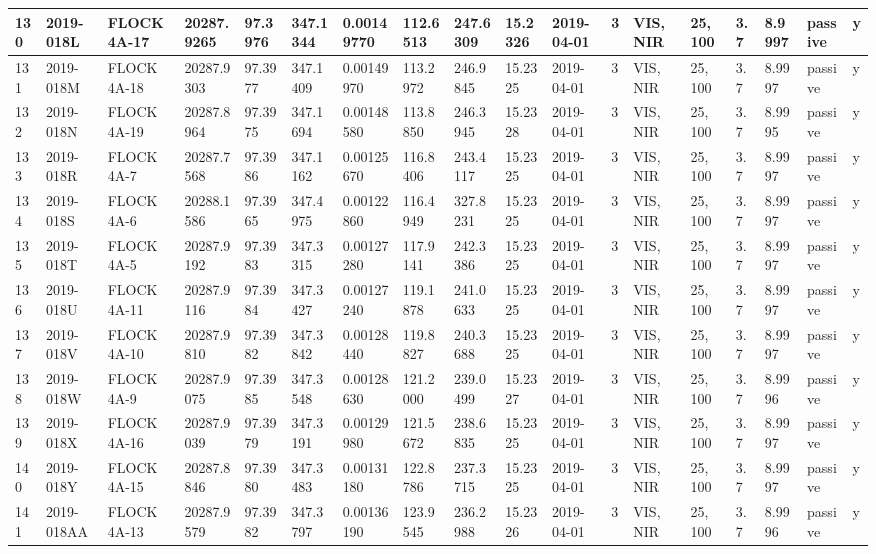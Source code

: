 \documentclass[12pt,a4paper,notitlepage,twoside,openright]{report}
\begin{document}
\begin{longtable}{|l|l|l|l|l|l|l|l|l|l|l|l|l|l|l|l|l|l|}
        130 & 2019-018L & FLOCK 4A-17 & 20287.9265 & 97.3976 & 347.1344 & 0.00149770 & 112.6513 & 247.6309 & 15.2326 & 2019-04-01 & 3 & VIS, NIR & 25, 100 & 3.7 & 8.9997 & passive & y \\ \hline
        131 & 2019-018M & FLOCK 4A-18 & 20287.9303 & 97.3977 & 347.1409 & 0.00149970 & 113.2972 & 246.9845 & 15.2325 & 2019-04-01 & 3 & VIS, NIR & 25, 100 & 3.7 & 8.9997 & passive & y \\ \hline
        132 & 2019-018N & FLOCK 4A-19 & 20287.8964 & 97.3975 & 347.1694 & 0.00148580 & 113.8850 & 246.3945 & 15.2328 & 2019-04-01 & 3 & VIS, NIR & 25, 100 & 3.7 & 8.9995 & passive & y \\ \hline
        133 & 2019-018R & FLOCK 4A-7 & 20287.7568 & 97.3986 & 347.1162 & 0.00125670 & 116.8406 & 243.4117 & 15.2325 & 2019-04-01 & 3 & VIS, NIR & 25, 100 & 3.7 & 8.9997 & passive & y \\ \hline
        134 & 2019-018S & FLOCK 4A-6 & 20288.1586 & 97.3965 & 347.4975 & 0.00122860 & 116.4949 & 327.8231 & 15.2325 & 2019-04-01 & 3 & VIS, NIR & 25, 100 & 3.7 & 8.9997 & passive & y \\ \hline
        135 & 2019-018T & FLOCK 4A-5 & 20287.9192 & 97.3983 & 347.3315 & 0.00127280 & 117.9141 & 242.3386 & 15.2325 & 2019-04-01 & 3 & VIS, NIR & 25, 100 & 3.7 & 8.9997 & passive & y \\ \hline
        136 & 2019-018U & FLOCK 4A-11 & 20287.9116 & 97.3984 & 347.3427 & 0.00127240 & 119.1878 & 241.0633 & 15.2325 & 2019-04-01 & 3 & VIS, NIR & 25, 100 & 3.7 & 8.9997 & passive & y \\ \hline
        137 & 2019-018V & FLOCK 4A-10 & 20287.9810 & 97.3982 & 347.3842 & 0.00128440 & 119.8827 & 240.3688 & 15.2325 & 2019-04-01 & 3 & VIS, NIR & 25, 100 & 3.7 & 8.9997 & passive & y \\ \hline
        138 & 2019-018W & FLOCK 4A-9 & 20287.9075 & 97.3985 & 347.3548 & 0.00128630 & 121.2000 & 239.0499 & 15.2327 & 2019-04-01 & 3 & VIS, NIR & 25, 100 & 3.7 & 8.9996 & passive & y \\ \hline
        139 & 2019-018X & FLOCK 4A-16 & 20287.9039 & 97.3979 & 347.3191 & 0.00129980 & 121.5672 & 238.6835 & 15.2325 & 2019-04-01 & 3 & VIS, NIR & 25, 100 & 3.7 & 8.9997 & passive & y \\ \hline
        140 & 2019-018Y & FLOCK 4A-15 & 20287.8846 & 97.3980 & 347.3483 & 0.00131180 & 122.8786 & 237.3715 & 15.2325 & 2019-04-01 & 3 & VIS, NIR & 25, 100 & 3.7 & 8.9997 & passive & y \\ \hline
        141 & 2019-018AA & FLOCK 4A-13 & 20287.9579 & 97.3982 & 347.3797 & 0.00136190 & 123.9545 & 236.2988 & 15.2326 & 2019-04-01 & 3 & VIS, NIR & 25, 100 & 3.7 & 8.9996 & passive & y \\ \hline

\end{longtable}
\end{document}
